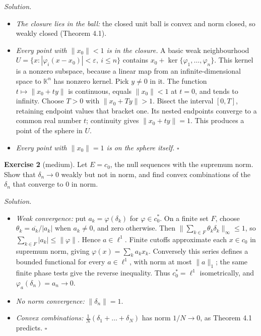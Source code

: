 \documentclass[
  english,
  11pt,
  a4paper,
]{article}
\providecommand{\tightlist}{%
  \setlength{\itemsep}{0pt}\setlength{\parskip}{0pt}}
\begin{document}
\emph{Solution.}

\begin{itemize}
\tightlist
\item
  \emph{The closure lies in the ball:} the closed unit ball is convex
  and norm closed, so weakly closed (Theorem 4.1).
\item
  \emph{Every point with \(\|x_0\|<1\) is in the closure.} A basic weak
  neighbourhood \(U=\{x:|\varphi_i(x-x_0)|<\varepsilon,\ i\le n\}\)
  contains \(x_0+\ker\{\varphi_1,\dots,\varphi_n\}\). This kernel is a
  nonzero subspace, because a linear map from an infinite-dimensional
  space to \(\mathbb K^n\) has nonzero kernel. Pick \(y\ne0\) in it. The
  function \(t\mapsto\|x_0+ty\|\) is continuous, equals \(\|x_0\|<1\) at
  \(t=0\), and tends to infinity. Choose \(T>0\) with \(\|x_0+Ty\|>1\).
  Bisect the interval \([0,T]\), retaining endpoint values that bracket
  one. Its nested endpoints converge to a common real number \(t\);
  continuity gives \(\|x_0+ty\|=1\). This produces a point of the sphere
  in \(U\).
\item
  \emph{Every point with \(\|x_0\|=1\) is on the sphere itself.}
  \(\square\)
\end{itemize}

\textbf{Exercise 2} (medium). Let \(E=c_0\), the null sequences with the
supremum norm. Show that \(\delta_n\to0\) weakly but not in norm, and
find convex combinations of the \(\delta_n\) that converge to \(0\) in
norm.

\emph{Solution.}

\begin{itemize}
\tightlist
\item
  \emph{Weak convergence:} put \(a_k=\varphi(\delta_k)\) for
  \(\varphi\in c_0^*\). On a finite set \(F\), choose
  \(\theta_k=\overline{a_k}/|a_k|\) when \(a_k\ne0\), and zero
  otherwise. Then \(\|\sum_{k\in F}\theta_k\delta_k\|_\infty\leq1\), so
  \(\sum_{k\in F}|a_k|\leq\|\varphi\|\). Hence \(a\in\ell^1\). Finite
  cutoffs approximate each \(x\in c_0\) in supremum norm, giving
  \(\varphi(x)=\sum_ka_kx_k\). Conversely this series defines a bounded
  functional for every \(a\in\ell^1\), with norm at most \(\|a\|_1\);
  the same finite phase tests give the reverse inequality. Thus
  \(c_0^*=\ell^1\) isometrically, and \(\varphi_a(\delta_n)=a_n\to0\).
\item
  \emph{No norm convergence:} \(\|\delta_n\|=1\).
\item
  \emph{Convex combinations:} \(\frac1N(\delta_1+\dots+\delta_N)\) has
  norm \(1/N\to0\), as Theorem 4.1 predicts. \(\square\)
\end{itemize}
\end{document}
